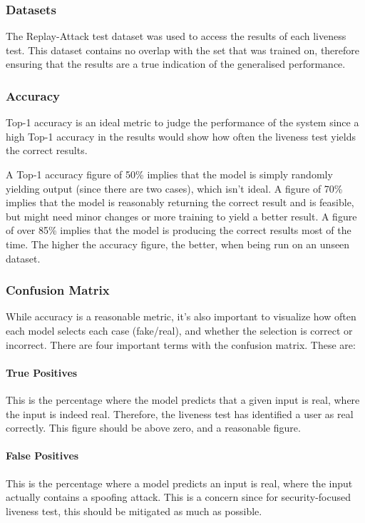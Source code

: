 \documentclass[10pt,a4paper]{article}
\begin{document}
        \subsubsection{Datasets}
            The Replay-Attack test dataset was used to access the results of each liveness test. This dataset contains no overlap with the set that was trained on, therefore ensuring that
            the results are a true indication of the generalised performance.

        \subsubsection{Accuracy}
             Top-1 accuracy is an ideal metric to judge the performance of the system since a high Top-1 accuracy in the results would show how often the liveness test yields the correct results.
            
            A Top-1 accuracy figure of 50\% implies that the model is simply randomly yielding output (since there are two cases), which isn't ideal. A figure of 70\% implies that the model is reasonably returning the correct result and is feasible, but might need minor changes or more training to yield a better result. A figure of over 85\% implies that the model is producing the correct results most of the time. The higher the accuracy figure, the better, when being run on an unseen dataset.

        \subsubsection{Confusion Matrix}
            While accuracy is a reasonable metric, it's also important to visualize how often each model selects each case (fake/real), and whether the selection is correct or incorrect.
            There are four important terms with the confusion matrix. These are:
            \paragraph{True Positives}
                This is the percentage where the model predicts that a given input is real, where the input is indeed real. Therefore, the liveness test has identified a user as real correctly.
                This figure should be above zero, and a reasonable figure. 

            \paragraph{False Positives}
                This is the percentage where a model predicts an input is real, where the input actually contains a spoofing attack. This is a concern since for security-focused
                liveness test, this should be mitigated as much as possible.
\end{document}
